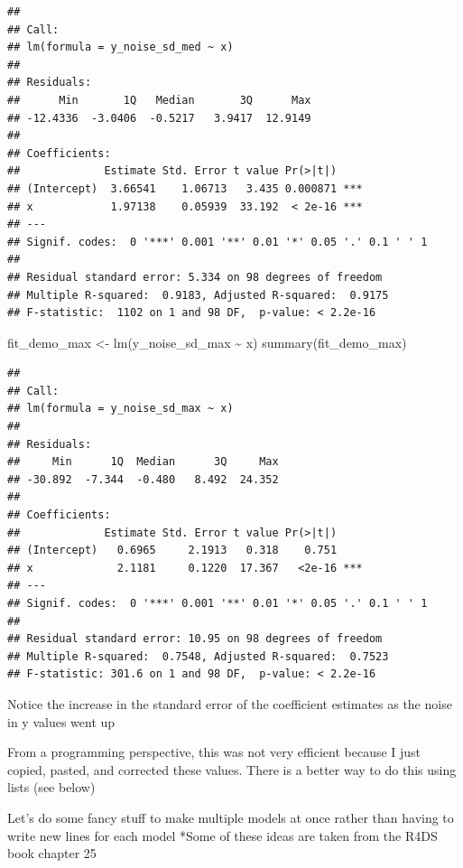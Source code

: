 \documentclass[
]{book}
\newenvironment{Shaded}{\begin{snugshade}}{\end{snugshade}}
\newcommand{\FunctionTok}[1]{\textcolor[rgb]{0.00,0.00,0.00}{#1}}
\newcommand{\NormalTok}[1]{#1}
\newcommand{\OtherTok}[1]{\textcolor[rgb]{0.56,0.35,0.01}{#1}}
\newcommand{\SpecialCharTok}[1]{\textcolor[rgb]{0.00,0.00,0.00}{#1}}
\begin{document}
\begin{verbatim}
## 
## Call:
## lm(formula = y_noise_sd_med ~ x)
## 
## Residuals:
##      Min       1Q   Median       3Q      Max 
## -12.4336  -3.0406  -0.5217   3.9417  12.9149 
## 
## Coefficients:
##             Estimate Std. Error t value Pr(>|t|)    
## (Intercept)  3.66541    1.06713   3.435 0.000871 ***
## x            1.97138    0.05939  33.192  < 2e-16 ***
## ---
## Signif. codes:  0 '***' 0.001 '**' 0.01 '*' 0.05 '.' 0.1 ' ' 1
## 
## Residual standard error: 5.334 on 98 degrees of freedom
## Multiple R-squared:  0.9183, Adjusted R-squared:  0.9175 
## F-statistic:  1102 on 1 and 98 DF,  p-value: < 2.2e-16
\end{verbatim}

\begin{Shaded}
\begin{Highlighting}[]
\NormalTok{fit\_demo\_max }\OtherTok{\textless{}{-}} \FunctionTok{lm}\NormalTok{(y\_noise\_sd\_max }\SpecialCharTok{\textasciitilde{}}\NormalTok{ x)}
\FunctionTok{summary}\NormalTok{(fit\_demo\_max)}
\end{Highlighting}
\end{Shaded}

\begin{verbatim}
## 
## Call:
## lm(formula = y_noise_sd_max ~ x)
## 
## Residuals:
##     Min      1Q  Median      3Q     Max 
## -30.892  -7.344  -0.480   8.492  24.352 
## 
## Coefficients:
##             Estimate Std. Error t value Pr(>|t|)    
## (Intercept)   0.6965     2.1913   0.318    0.751    
## x             2.1181     0.1220  17.367   <2e-16 ***
## ---
## Signif. codes:  0 '***' 0.001 '**' 0.01 '*' 0.05 '.' 0.1 ' ' 1
## 
## Residual standard error: 10.95 on 98 degrees of freedom
## Multiple R-squared:  0.7548, Adjusted R-squared:  0.7523 
## F-statistic: 301.6 on 1 and 98 DF,  p-value: < 2.2e-16
\end{verbatim}

Notice the increase in the standard error of the coefficient estimates as the noise in y values went up

From a programming perspective, this was not very efficient because I just copied, pasted, and corrected these values.
There is a better way to do this using lists (see below)

Let's do some fancy stuff to make multiple models at once rather than having to write new lines for each model
*Some of these ideas are taken from the R4DS book chapter 25
\end{document}
